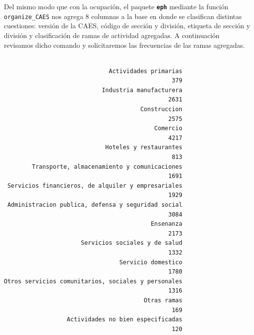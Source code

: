\documentclass[
]{article}
\newenvironment{Shaded}{\begin{snugshade}}{\end{snugshade}}
\newcommand{\AttributeTok}[1]{\textcolor[rgb]{0.13,0.29,0.53}{#1}}
\newcommand{\CommentTok}[1]{\textcolor[rgb]{0.56,0.35,0.01}{\textit{#1}}}
\newcommand{\FunctionTok}[1]{\textcolor[rgb]{0.13,0.29,0.53}{\textbf{#1}}}
\newcommand{\NormalTok}[1]{#1}
\newcommand{\OtherTok}[1]{\textcolor[rgb]{0.56,0.35,0.01}{#1}}
\newcommand{\SpecialCharTok}[1]{\textcolor[rgb]{0.81,0.36,0.00}{\textbf{#1}}}
\begin{document}
Del mismo modo que con la ocupación, el paquete \textbf{\texttt{eph}} mediante la función \texttt{organize\_CAES} nos agrega 8 columnas a la base en donde se clasifican distintas cuestiones: versión de la CAES, código de sección y división, etiqueta de sección y división y clasificación de ramas de actividad agregadas. A continuación revisamos dicho comando y solicitaremos las frecuencias de las ramas agregadas.

\begin{Shaded}
\end{Shaded}

\begin{verbatim}

                              Actividades primarias 
                                                379 
                            Industria manufacturera 
                                               2631 
                                       Construccion 
                                               2575 
                                           Comercio 
                                               4217 
                             Hoteles y restaurantes 
                                                813 
        Transporte, almacenamiento y comunicaciones 
                                               1691 
 Servicios financieros, de alquiler y empresariales 
                                               1929 
 Administracion publica, defensa y seguridad social 
                                               3084 
                                          Ensenanza 
                                               2173 
                      Servicios sociales y de salud 
                                               1332 
                                 Servicio domestico 
                                               1780 
Otros servicios comunitarios, sociales y personales 
                                               1316 
                                        Otras ramas 
                                                169 
                  Actividades no bien especificadas 
                                                120 
\end{verbatim}
\end{document}
